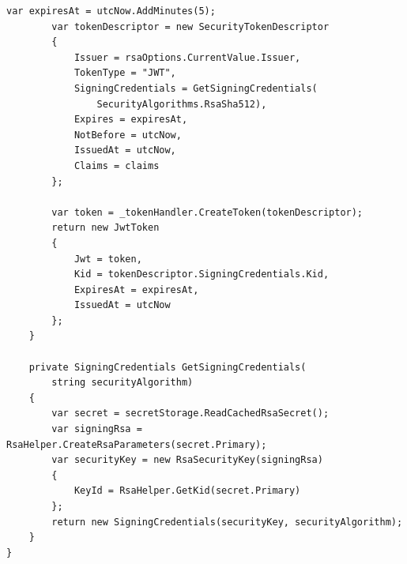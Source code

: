 \begin{lstlisting}[language={[Sharp]C},
  label={lst:app-token-generator},
  caption={Класс DefaultTokenGenerator: генерация и подпись JWT-токенов}]
        var expiresAt = utcNow.AddMinutes(5);
        var tokenDescriptor = new SecurityTokenDescriptor
        {
            Issuer = rsaOptions.CurrentValue.Issuer,
            TokenType = "JWT",
            SigningCredentials = GetSigningCredentials(
                SecurityAlgorithms.RsaSha512),
            Expires = expiresAt,
            NotBefore = utcNow,
            IssuedAt = utcNow,
            Claims = claims
        };

        var token = _tokenHandler.CreateToken(tokenDescriptor);
        return new JwtToken
        {
            Jwt = token,
            Kid = tokenDescriptor.SigningCredentials.Kid,
            ExpiresAt = expiresAt,
            IssuedAt = utcNow
        };
    }

    private SigningCredentials GetSigningCredentials(
        string securityAlgorithm)
    {
        var secret = secretStorage.ReadCachedRsaSecret();
        var signingRsa = RsaHelper.CreateRsaParameters(secret.Primary);
        var securityKey = new RsaSecurityKey(signingRsa)
        {
            KeyId = RsaHelper.GetKid(secret.Primary)
        };
        return new SigningCredentials(securityKey, securityAlgorithm);
    }
}
\end{lstlisting}

